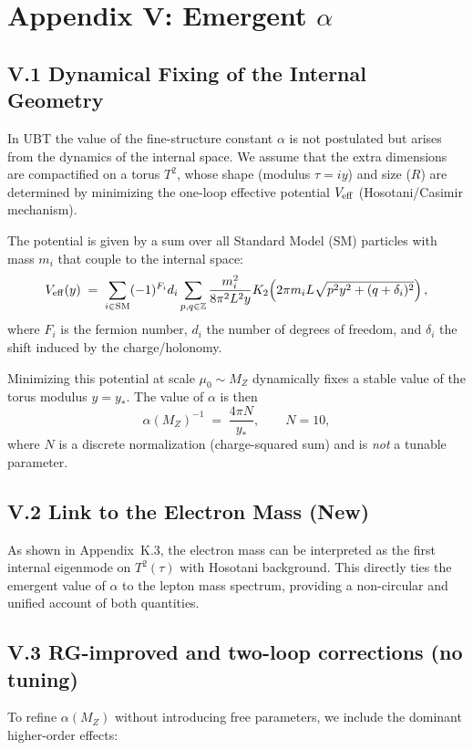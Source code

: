 
\appendix
\section*{Appendix V: Emergent $\alpha$}

\subsection*{V.1 Dynamical Fixing of the Internal Geometry}
In UBT the value of the fine-structure constant $\alpha$ is not postulated but arises from the dynamics of the internal space. 
We assume that the extra dimensions are compactified on a torus $T^2$, whose shape (modulus $\tau=i y$) and size ($R$) are determined by minimizing the one-loop effective potential $V_{\rm eff}$ (Hosotani/Casimir mechanism).

The potential is given by a sum over all Standard Model (SM) particles with mass $m_i$ that couple to the internal space:
\begin{equation}
V_{\rm eff}(y) \;=\; \sum_{i \in \text{SM}} (-1)^{F_i} d_i 
  \sum_{p,q \in \mathbb{Z}} \frac{m_i^2}{8\pi^2 L^2 y} 
  K_2\!\left(2\pi m_i L \sqrt{p^2 y^2 + (q+\delta_i)^2}\right),
\end{equation}
where $F_i$ is the fermion number, $d_i$ the number of degrees of freedom, and $\delta_i$ the shift induced by the charge/holonomy.

Minimizing this potential at scale $\mu_0\sim M_Z$ dynamically fixes a stable value of the torus modulus $y=y_\ast$. The value of $\alpha$ is then
\begin{equation}
\alpha(M_Z)^{-1} \;=\; \frac{4\pi N}{y_\ast}, \qquad N=10,
\end{equation}
where $N$ is a discrete normalization (charge-squared sum) and is \emph{not} a tunable parameter.

\subsection*{V.2 Link to the Electron Mass (New)}
As shown in Appendix~K.3, the electron mass can be interpreted as the first internal eigenmode on $T^2(\tau)$ with Hosotani background. 
This directly ties the emergent value of $\alpha$ to the lepton mass spectrum, providing a non-circular and unified account of both quantities.


\subsection*{V.3 RG-improved and two-loop corrections (no tuning)}
To refine $\alpha(M_Z)$ without introducing free parameters, we include the dominant higher-order effects:

